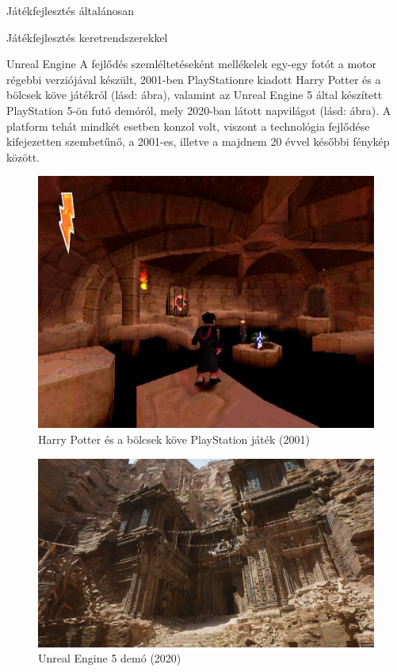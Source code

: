 \begin{MyChapter}{Játékfejlesztés általánosan}
\begin{MySection}{Játékfejlesztés keretrendszerekkel}
\begin{MySubSection}{Unreal Engine}
		A fejlődés szemléltetéseként mellékelek egy-egy fotót a motor régebbi verziójával készült, 2001-ben PlayStationre kiadott Harry Potter és a bölcsek köve játékról (lásd:  ábra), valamint az Unreal Engine 5 által készített PlayStation 5-ön futó demóról, mely 2020-ban látott napvilágot (lásd:  ábra). A platform tehát mindkét esetben konzol volt, viszont a technológia fejlődése kifejezetten szembetűnő, a 2001-es, illetve a majdnem 20 évvel későbbi fénykép között.
		\begin{figure}[h!]
			\centering
			\includegraphics[scale=0.4]{kepek/unrealEngine/harry-potter-and-the-sorcerer-s-stone-ps.jpeg}
			\caption{Harry Potter és a bölcsek köve PlayStation játék (2001)}
			\label{fig:unrealEngine:harry-potter-and-the-sorcerer-s-stone-ps}
		\end{figure}
		\begin{figure}[h!]
			\centering
			\includegraphics[scale=0.16]{kepek/unrealEngine/First-look-at-Unreal_Engine_5.jpg}
			\caption{Unreal Engine 5 demó (2020)}
			\label{fig:unrealEngine:First-look-at-Unreal_Engine_5}
		\end{figure}
	

\end{MySubSection}
\end{MySection}
\end{MyChapter}

